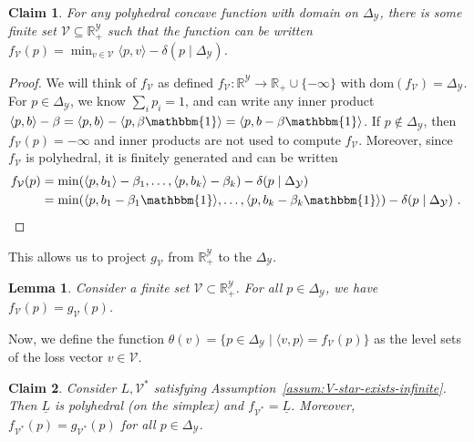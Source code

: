 \documentclass[11pt]{article}
\newcommand{\Comments}{1}
\newcommand{\mynote}[2]{\ifnum\Comments=1\textcolor{#1}{#2}\fi}
\newcommand{\raf}[1]{\mynote{darkgreen}{[RF: #1]}}
\newcommand{\reals}{\mathbb{R}}
\newcommand{\dom}{\mathrm{dom}}
\newcommand{\simplex}{\Delta_\Y}
\newcommand{\V}{\mathcal{V}}
\newcommand{\Y}{\mathcal{Y}}
\newcommand{\risk}[1]{\underline{#1}}
\newcommand{\inprod}[2]{\langle #1, #2 \rangle}%
\newcommand{\ones}{\mathbbm{1}}
\newtheorem{lemma}{Lemma}
\newtheorem{claim}{Claim}
\begin{document}
\begin{claim}\label{claim:f-min-affine}
	For any polyhedral concave function with domain on $\simplex$, there is some finite set $\V \subseteq \reals^\Y_+$ such that the function can be written $f_\V(p) = \min_{v\in\V} \inprod{p}{v} - \delta(p \mid \simplex)$.  %
\end{claim}
\begin{proof}
  We will think of $f_\V$ as defined $f_\V:\reals^\Y\to\reals_+\cup\{-\infty\}$  with $\dom(f_\V) = \simplex$.
  For $p \in \simplex$, we know $\sum_i p_i = 1$, and can write any inner product $\inprod{p}{b} - \beta = \inprod{p}{b} - \inprod{p}{\beta \ones} = \inprod{p}{b - \beta \ones}$.
  If $p \not \in \simplex$, then $f_\V(p) = -\infty$ and inner products are not used to compute $f_\V$.
  Moreover, since $f_\V$ is polyhedral, it is finitely generated \citep[Proposition 19.1.2]{rockafellar1997convex} and can be written 
	\begin{align*}
	f_\V(p) %
		 &= \min(\inprod{p}{b_1} - \beta_1, \ldots, \inprod{p}{b_k} - \beta_k) - \delta(p \mid \simplex)\\
		 &= \min(\inprod{p}{b_1 - \beta_1 \ones}, \ldots, \inprod{p}{b_k - \beta_k \ones}) - \delta(p \mid \simplex)~.~
	\end{align*}
\end{proof}

\noindent
This allows us to project $g_\V$ from $\reals^\Y_+$ to the $\simplex$.
\begin{lemma}\label{cor:f-matches-g-on-simplex}
  Consider a finite set $\V \subset \reals^\Y_+$.
  For all $p \in \simplex$, we have $f_\V(p) = g_\V(p)$.
\end{lemma}
Now, we define the function $\theta(v) = \{p \in \simplex \mid \inprod{v}{p} = f_\V(p)\}$ as the level sets of the loss vector $v \in \V$. %

\begin{claim}\label{claim:gV-and-fV}
	Consider $L, \V^*$ satisfying Assumption~\ref{assum:V-star-exists-infinite}.
	Then $\risk L$ is polyhedral (on the simplex) and $f_{\V^*} = \risk L$.
	Moreover, $f_{\V^*}(p) = g_{\V^*}(p)$ for all $p \in \simplex$.
\end{claim}
\end{document}
